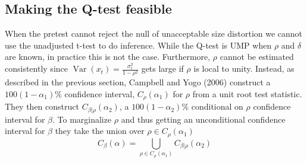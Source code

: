 \documentclass{article}
\begin{document}
\subsection{Making the Q-test feasible}
When the pretest cannot reject the null of unacceptable size distortion we cannot use the unadjusted t-test to do inference. While the Q-test is UMP when $\rho$ and $\delta$ are known, in practice this is not the case. Furthermore, $\rho$ cannot be estimated consistently since $\operatorname{Var}\left(x_{t}\right)=\frac{\sigma_{e}^{2}}{1-\rho^{2}}$ gets large if $\rho$ is local to unity. Instead, as described in the previous section, Campbell and Yogo (2006) construct a $100\left(1-\alpha_{1}\right) \%$ confidence interval, $C_{\rho}\left(\alpha_{1}\right)$ for $\rho$ from a unit root test statistic. They then construct $C_{\beta | \rho}\left(\alpha_{2}\right)$, a $100\left(1-\alpha_{2}\right) \%$ conditional on $\rho$ confidence interval for $\beta$. To marginalize $\rho$ and thus getting an unconditional confidence interval for $\beta$ they take the union over $\rho \in C_{\rho}\left(\alpha_{1}\right)$
\begin{equation}
C_{\beta}(\alpha)=\bigcup_{\rho \in C_{\rho}\left(\alpha_{1}\right)} C_{\beta | \rho}\left(\alpha_{2}\right)
\end{equation}
\end{document}
